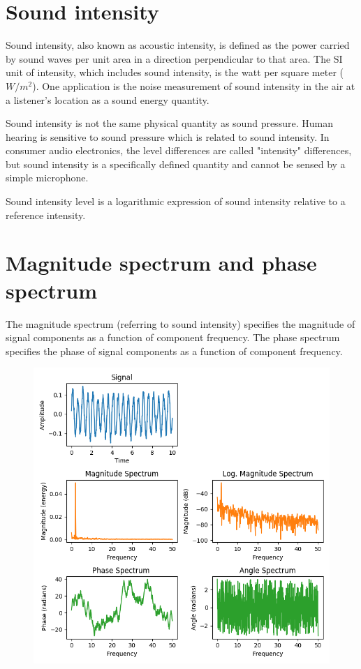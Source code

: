 \documentclass[journal,compsoc]{IEEEtran}
\begin{document}
\section{Sound intensity}

Sound intensity, also known as acoustic intensity, is defined as the power carried by sound waves per unit area in a direction perpendicular to that area. The SI unit of intensity, which includes sound intensity, is the watt per square meter (\(W/m^2\)). One application is the noise measurement of sound intensity in the air at a listener's location as a sound energy quantity.

Sound intensity is not the same physical quantity as sound pressure. Human hearing is sensitive to sound pressure which is related to sound intensity. In consumer audio electronics, the level differences are called "intensity" differences, but sound intensity is a specifically defined quantity and cannot be sensed by a simple microphone.

Sound intensity level is a logarithmic expression of sound intensity relative to a reference intensity.

\section{Magnitude spectrum and phase spectrum}
The magnitude spectrum (referring to sound intensity) specifies the magnitude of signal components as a function of component frequency. The phase spectrum specifies the phase of signal components as a function of component frequency. 

\begin{figure}[H]
\begin{center}
\includegraphics[scale=0.5]{magnitude_phase_spectra}
\end{center}
\end{figure}
\end{document}
